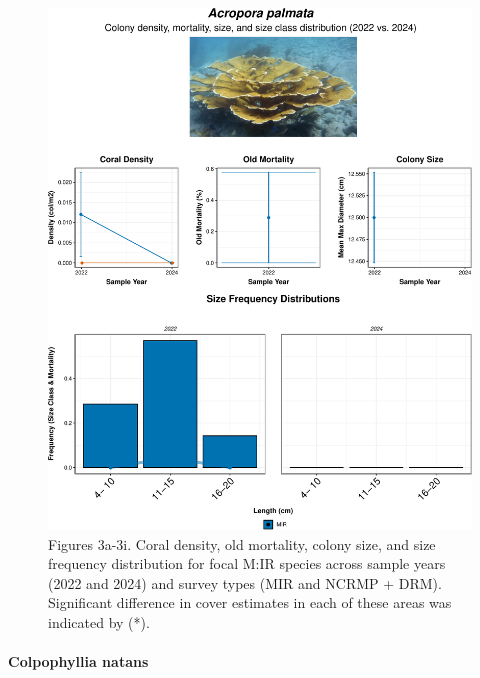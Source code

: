 \documentclass[
]{article}
\let\oldparagraph\paragraph
\renewcommand{\paragraph}[1]{\oldparagraph{#1}\mbox{}}
\begin{document}
\begin{figure}

{\centering \includegraphics{MIR_quarto_files/figure-pdf/coral-tabyss-2.pdf}

}

\caption{Figures 3a-3i. Coral density, old mortality, colony size, and
size frequency distribution for focal M:IR species across sample years
(2022 and 2024) and survey types (MIR and NCRMP + DRM). Significant
difference in cover estimates in each of these areas was indicated by
(*).}

\end{figure}

\hypertarget{colpophyllia-natans}{%
\paragraph{\texorpdfstring{ Colpophyllia natans
}{ Colpophyllia natans }}\label{colpophyllia-natans}}
\end{document}
